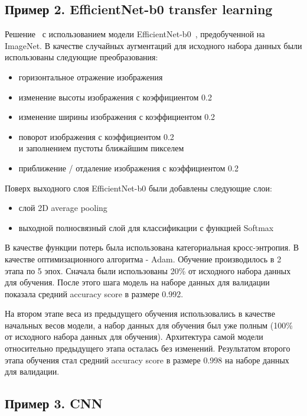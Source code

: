 \documentclass[a4paper,12pt]{extarticle}
\begin{document}
\newpage
\subsection{Пример 2. EfficientNet-b0 transfer learning}

Решение~\cite{example_2} с использованием модели EfficientNet-b0~\cite{efficientnet}, предобученной на ImageNet. В качестве случайных
аугментаций для исходного набора данных были использованы следующие преобразования:

\begin{itemize}
    \item горизонтальное отражение изображения
    \item изменение высоты изображения с коэффициентом 0.2
    \item изменение ширины изображения с коэффициентом 0.2
    \item поворот изображения с коэффициентом 0.2\\ и заполнением пустоты ближайшим пикселем
    \item приближение / отдаление изображения с коэффициентом 0.2
\end{itemize}

Поверх выходного слоя EfficientNet-b0 были добавлены следующие слои:

\begin{itemize}
    \item слой 2D average pooling
    \item выходной полносвязный слой для классификации с функцией Softmax
\end{itemize}

В качестве функции потерь была использована категориальная кросс-энтропия. В качестве
оптимизационного алгоритма - Adam. Обучение производилось в 2 этапа по 5 эпох. Сначала были
использованы 20\% от исходного набора данных для обучения. После этого шага модель на наборе данных
для валидации показала средний accuracy score в размере 0.992.

На втором этапе веса из предыдущего обучения использовались в качестве начальных весов модели, а
набор данных для обучения был уже полным (100\% от исходного набора данных для обучения).
Архитектура самой модели относительно предыдущего этапа осталась без изменений. Результатом второго
этапа обучения стал средний accuracy score в размере 0.998 на наборе данных для валидации.

\newpage
\subsection{Пример 3. CNN}
\end{document}
